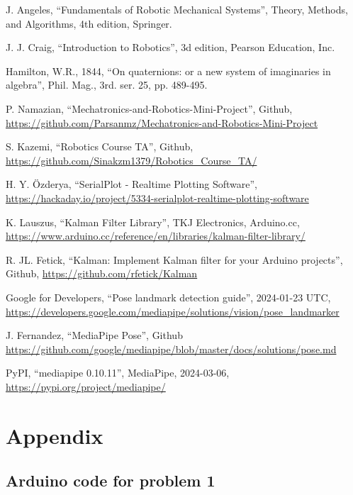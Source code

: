 \documentclass[conference]{IEEEtran}
\begin{document}
\vspace{30px}
\begin{thebibliography}{00}

   J. Angeles, ``Fundamentals of Robotic Mechanical Systems'', Theory, Methods, and Algorithms, 4th edition, Springer.

   J. J. Craig, ``Introduction to Robotics'', 3d edition, Pearson Education, Inc.

   Hamilton, W.R., 1844, ``On quaternions: or a new system of imaginaries in algebra'', Phil. Mag., 3rd. ser. 25, pp. 489-495.

   P. Namazian, ``Mechatronics-and-Robotics-Mini-Project'', Github, \url{https://github.com/Parsanmz/Mechatronics-and-Robotics-Mini-Project}

   S. Kazemi, ``Robotics Course TA'', Github, \url{https://github.com/Sinakzm1379/Robotics_Course_TA/}

   H. Y. Özderya, ``SerialPlot - Realtime Plotting Software'', \url{https://hackaday.io/project/5334-serialplot-realtime-plotting-software}

   K. Lauszus, ``Kalman Filter Library'', TKJ Electronics, Arduino.cc, \url{https://www.arduino.cc/reference/en/libraries/kalman-filter-library/}

   R. JL. Fetick, ``Kalman: Implement Kalman filter for your Arduino projects'', Github, \url{https://github.com/rfetick/Kalman}

   Google for Developers, ``Pose landmark detection guide'', 2024-01-23 UTC, \url{https://developers.google.com/mediapipe/solutions/vision/pose_landmarker}

   J. Fernandez, ``MediaPipe Pose'', Github \url{https://github.com/google/mediapipe/blob/master/docs/solutions/pose.md}

   PyPI, ``mediapipe 0.10.11'', MediaPipe, 2024-03-06, \url{https://pypi.org/project/mediapipe/}

\end{thebibliography}
\vspace{80px}


\section{Appendix}
\subsection{Arduino code for problem 1}
\end{document}
